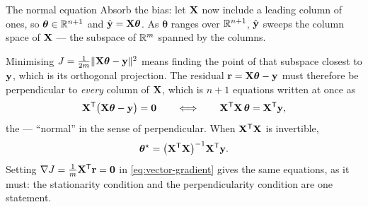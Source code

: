 \begin{derivation}{The normal equation}
Absorb the bias: let $\mathbf{X}$ now include a leading column of ones, so
$\bm{\theta}\in\mathbb{R}^{n+1}$ and $\hat{\mathbf{y}} = \mathbf{X}\bm{\theta}$. As
$\bm{\theta}$ ranges over $\mathbb{R}^{n+1}$, $\hat{\mathbf{y}}$ sweeps the column space of
$\mathbf{X}$ --- the subspace of $\mathbb{R}^{m}$ spanned by the columns.

Minimising $J = \frac{1}{2m}\|\mathbf{X}\bm{\theta}-\mathbf{y}\|^2$ means finding the point
of that subspace closest to $\mathbf{y}$, which is its orthogonal projection. The
residual $\mathbf{r} = \mathbf{X}\bm{\theta}-\mathbf{y}$ must therefore be perpendicular to
\emph{every} column of $\mathbf{X}$, which is $n+1$ equations written at once as
\begin{equation}
  \mathbf{X}^{\mathsf{T}}\bigl(\mathbf{X}\bm{\theta} - \mathbf{y}\bigr) = \mathbf{0}
  \qquad\Longleftrightarrow\qquad
  \mathbf{X}^{\mathsf{T}}\mathbf{X}\,\bm{\theta} = \mathbf{X}^{\mathsf{T}}\mathbf{y} ,
  \label{eq:normal-equations}
\end{equation}
the  --- ``normal'' in the sense of perpendicular. When
$\mathbf{X}^{\mathsf{T}}\mathbf{X}$ is invertible,
\begin{equation}
  \bm{\theta}^\star
    = \bigl(\mathbf{X}^{\mathsf{T}}\mathbf{X}\bigr)^{-1}\mathbf{X}^{\mathsf{T}}\mathbf{y} .
  \label{eq:normal-equation}
\end{equation}
Setting $\nabla J = \frac1m \mathbf{X}^{\mathsf{T}}\mathbf{r} = \mathbf{0}$ in
\cref{eq:vector-gradient} gives the same equations, as it must: the stationarity
condition and the perpendicularity condition are one statement.
\end{derivation}

